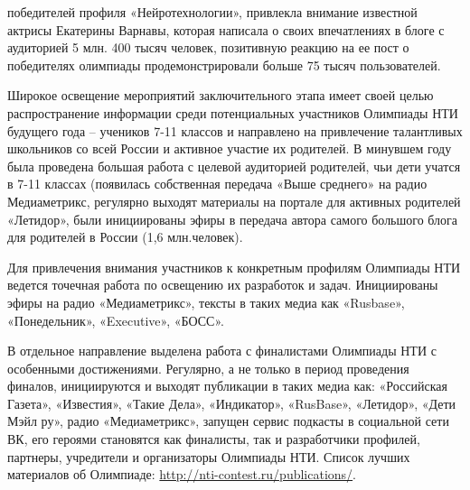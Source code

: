 победителей профиля «Нейротехнологии», привлекла внимание известной актрисы Екатерины Варнавы, которая написала о своих впечатлениях в блоге с аудиторией 5 млн. 400 тысяч человек, позитивную реакцию на ее пост о победителях олимпиады продемонстрировали больше 75 тысяч пользователей. 

Широкое освещение мероприятий заключительного этапа имеет своей целью распространение информации среди потенциальных участников Олимпиады НТИ будущего года – учеников 7-11 классов и направлено на привлечение талантливых школьников со всей России и активное участие их родителей. В минувшем году была проведена большая работа с целевой аудиторией родителей, чьи дети учатся в 7-11 классах (появилась собственная передача «Выше среднего» на радио Медиаметрикс, регулярно выходят материалы на портале для активных родителей «Летидор», были инициированы эфиры в передача автора самого большого блога для родителей в России (1,6 млн.человек). 

Для привлечения внимания участников к конкретным профилям Олимпиады НТИ ведется точечная работа по освещению их разработок и задач. Инициированы эфиры на радио «Медиаметрикс», тексты в таких медиа как «Rusbase», «Понедельник», «Executive», «БОСС».

В отдельное направление выделена работа с финалистами Олимпиады НТИ с особенными достижениями. Регулярно, а не только в период проведения финалов, инициируются и выходят публикации в таких медиа как: «Российская Газета», «Известия», «Такие Дела», «Индикатор», «RusBase», «Летидор», «Дети Мэйл ру», радио «Медиаметрикс», запущен сервис подкасты в социальной сети ВК, его героями становятся как финалисты, так и разработчики профилей, партнеры, учредители и организаторы Олимпиады НТИ. 
Список лучших материалов об Олимпиаде: \url{http://nti-contest.ru/publications/}.